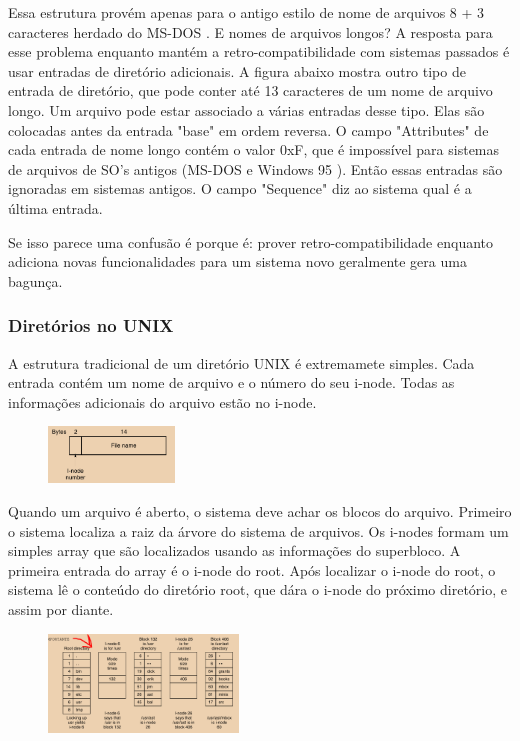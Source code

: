 \documentclass{article}
\newcommand\unix{{\color{red}UNIX} }
\newcommand\msdos{{\color{yellow}MS-DOS} }
\newcommand\winnovecinco{{\color{green}Windows 95} }
\begin{document}
Essa estrutura provém apenas para o antigo estilo de nome de arquivos 8 + 3 caracteres herdado do \msdos. E nomes de arquivos longos? A resposta para esse problema enquanto mantém a retro-compatibilidade com sistemas passados é usar entradas de diretório adicionais. A figura abaixo mostra outro tipo de entrada de diretório, que pode conter até 13 caracteres de um nome de arquivo longo. Um arquivo pode estar associado a várias entradas desse tipo. Elas são colocadas antes da entrada "base" em ordem reversa. O campo "Attributes" de cada entrada de nome longo contém o valor 0xF, que é impossível para sistemas de arquivos de SO's antigos (\msdos e \winnovecinco). Então essas entradas são ignoradas em sistemas antigos. O campo "Sequence" diz ao sistema qual é a última entrada. 

Se isso parece uma confusão é porque é: prover retro-compatibilidade enquanto adiciona novas funcionalidades para um sistema novo geralmente gera uma bagunça.

\newpage

\subsubsection{Diretórios no \unix}

A estrutura tradicional de um diretório \unix é extremamete simples. Cada entrada contém um nome de arquivo e o número do seu i-node. Todas as informações adicionais do arquivo estão no i-node. 

\begin{figure}[h]
  \begin{center}
    \includegraphics[width=0.3\textwidth]{img/5-15.png}
  \end{center}
  \caption{}
  \label{fig:}
\end{figure}

Quando um arquivo é aberto, o sistema deve achar os blocos do arquivo. Primeiro o sistema localiza a raiz da árvore do sistema de arquivos. Os i-nodes formam um simples array que são localizados usando as informações do superbloco. A primeira entrada do array é o i-node do root. Após localizar o i-node do root, o sistema lê o conteúdo do diretório root, que dára o i-node do próximo diretório, e assim por diante. 

\begin{figure}[h]
  \begin{center}
    \includegraphics[width=0.45\textwidth]{img/5-16.png}
  \end{center}
  \caption{}
  \label{fig:}
\end{figure}
\end{document}
